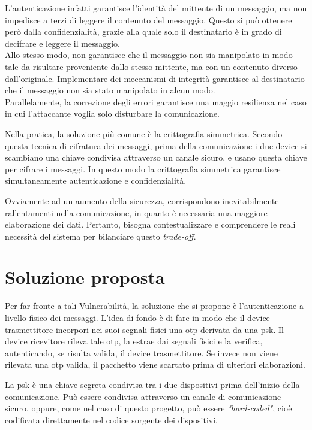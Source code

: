 L'autenticazione infatti garantisce l'identità del mittente di un messaggio, ma non impedisce a terzi di leggere il contenuto del messaggio. Questo si può ottenere però dalla confidenzialità, grazie alla quale solo il destinatario è in grado di decifrare e leggere il messaggio.\\
Allo stesso modo, non garantisce che il messaggio non sia manipolato in modo tale da risultare proveniente dallo stesso mittente, ma con un contenuto diverso dall'originale. Implementare dei meccanismi di integrità garantisce al destinatario che il messaggio non sia stato manipolato in alcun modo.\\
Parallelamente, la correzione degli errori garantisce una maggio resilienza nel caso in cui l'attaccante voglia solo disturbare la comunicazione.

Nella pratica, la soluzione più comune è la crittografia simmetrica. Secondo questa tecnica di cifratura dei messaggi, prima della comunicazione i due device si scambiano una chiave condivisa attraverso un canale sicuro, e usano questa chiave per cifrare i messaggi. In questo modo la crittografia simmetrica garantisce simultaneamente autenticazione e confidenzialità.

Ovviamente ad un aumento della sicurezza, corrispondono inevitabilmente rallentamenti nella comunicazione, in quanto è necessaria una maggiore elaborazione dei dati. Pertanto, bisogna contestualizzare e comprendere le reali necessità del sistema per bilanciare questo \textit{trade-off}.

\section{Soluzione proposta}

Per far fronte a tali Vulnerabilità, la soluzione che si propone è l'autenticazione a livello fisico dei messaggi. L'idea di fondo è di fare in modo che il device trasmettitore incorpori nei suoi segnali fisici una \gls{otp} derivata da una \gls{psk}. Il device ricevitore rileva tale \gls{otp}, la estrae dai segnali fisici e la verifica, autenticando, se risulta valida, il device trasmettitore. Se invece non viene rilevata una \gls{otp} valida, il pacchetto viene scartato prima di ulteriori elaborazioni.

La \gls{psk} è una chiave segreta condivisa tra i due dispositivi prima dell'inizio della comunicazione. Può essere condivisa attraverso un canale di comunicazione sicuro, oppure, come nel caso di questo progetto, può essere \textit{"hard-coded"}, cioè codificata direttamente nel codice sorgente dei dispositivi.


